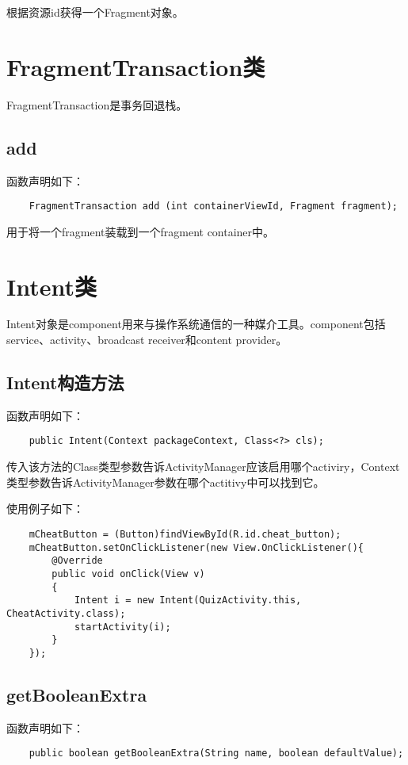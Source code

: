 \documentclass[a4paper,left=2.5cm,right=2.5cm,11pt]{article}
\begin{document}
	根据资源id获得一个Fragment对象。

\section{FragmentTransaction类}
	FragmentTransaction是事务回退栈。

\subsection{add}
	函数声明如下：
	\begin{lstlisting}
	FragmentTransaction add (int containerViewId, Fragment fragment);
	\end{lstlisting}

	用于将一个fragment装载到一个fragment container中。

\section{Intent类}
	Intent对象是component用来与操作系统通信的一种媒介工具。component包括service、activity、broadcast receiver和content provider。

\subsection{Intent构造方法}
	函数声明如下：
	\begin{lstlisting}
	public Intent(Context packageContext, Class<?> cls);
	\end{lstlisting}

	传入该方法的Class类型参数告诉ActivityManager应该启用哪个activiry，Context类型参数告诉ActivityManager参数在哪个actitivy中可以找到它。\par

	使用例子如下：
	\begin{lstlisting}
	mCheatButton = (Button)findViewById(R.id.cheat_button);
	mCheatButton.setOnClickListener(new View.OnClickListener(){
		@Override
		public void onClick(View v)
		{
			Intent i = new Intent(QuizActivity.this, CheatActivity.class);
			startActivity(i);
		}
	});
	\end{lstlisting}

\subsection{getBooleanExtra}
	函数声明如下：
	\begin{lstlisting}
	public boolean getBooleanExtra(String name, boolean defaultValue);
	\end{lstlisting}
\end{document}
